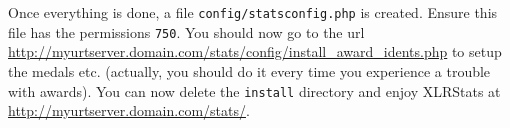 Once everything is done, a file \texttt{config/statsconfig.php} is created. 
Ensure this file has the permissions \texttt{750}. 
You should now go to the url\\
\url{http://myurtserver.domain.com/stats/config/install_award_idents.php} to
setup the medals etc. (actually, you should do it every time you experience a
trouble with awards). You can now delete the \texttt{install} directory and
enjoy XLRStats at \url{http://myurtserver.domain.com/stats/}. 


%
